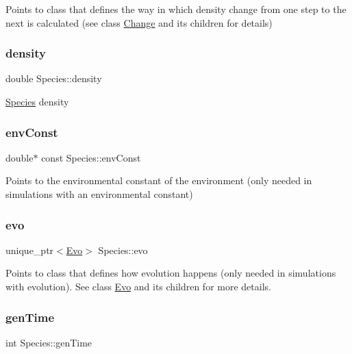 Points to class that defines the way in which density change from one step to the next is calculated (see class \hyperlink{classChange}{Change} and its children for details) \hypertarget{classSpecies_a2d5f0b6b799578963257416fa5ad0630}{}\label{classSpecies_a2d5f0b6b799578963257416fa5ad0630} 
\subsubsection{\texorpdfstring{density}{density}}
{\footnotesize\ttfamily double Species\+::density\hspace{0.3cm}{\ttfamily [protected]}}

\hyperlink{classSpecies}{Species} density \hypertarget{classSpecies_a95c7dd87e88653b245d52400b4134b68}{}\label{classSpecies_a95c7dd87e88653b245d52400b4134b68} 
\subsubsection{\texorpdfstring{env\+Const}{envConst}}
{\footnotesize\ttfamily double$\ast$ const Species\+::env\+Const\hspace{0.3cm}{\ttfamily [protected]}}

Points to the environmental constant of the environment (only needed in simulations with an environmental constant) \hypertarget{classSpecies_a25d6cad0391b8d98c986e17bcb5c2586}{}\label{classSpecies_a25d6cad0391b8d98c986e17bcb5c2586} 
\subsubsection{\texorpdfstring{evo}{evo}}
{\footnotesize\ttfamily unique\+\_\+ptr$<$\hyperlink{classEvo}{Evo}$>$ Species\+::evo\hspace{0.3cm}{\ttfamily [protected]}}

Points to class that defines how evolution happens (only needed in simulations with evolution). See class \hyperlink{classEvo}{Evo} and its children for more details. \hypertarget{classSpecies_a17c9e5d56923d9800bd9b2cfacbcba8b}{}\label{classSpecies_a17c9e5d56923d9800bd9b2cfacbcba8b} 
\subsubsection{\texorpdfstring{gen\+Time}{genTime}}
{\footnotesize\ttfamily int Species\+::gen\+Time\hspace{0.3cm}{\ttfamily [protected]}}

